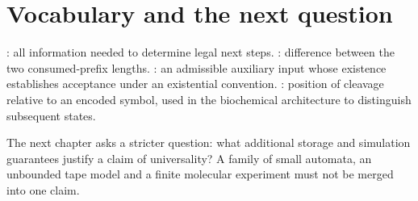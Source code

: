 \section{Vocabulary and the next question}
: all information needed to determine legal next steps.
: difference between the two consumed-prefix lengths.
: an admissible auxiliary input whose existence establishes
acceptance under an existential convention.
: position of cleavage relative to an encoded symbol,
used in the biochemical architecture to distinguish subsequent states.

The next chapter asks a stricter question: what additional storage and
simulation guarantees justify a claim of universality? A family of small
automata, an unbounded tape model and a finite molecular experiment must not
be merged into one claim.
